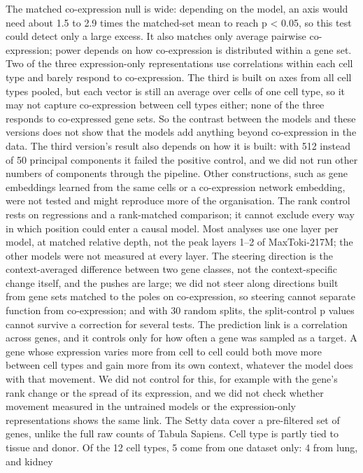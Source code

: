 \documentclass[
  11pt,
]{article}
\newcounter{none} %
\begin{document}
The matched co-expression null is wide: depending on the model, an axis
would need about 1.5 to 2.9 times the matched-set mean to reach p
\textless{} 0.05, so this test could detect only a large excess. It also
matches only average pairwise co-expression; power depends on how
co-expression is distributed within a gene set. Two of the three
expression-only representations use correlations within each cell type
and barely respond to co-expression. The third is built on axes from all
cell types pooled, but each vector is still an average over cells of one
cell type, so it may not capture co-expression between cell types
either; none of the three responds to co-expressed gene sets. So the
contrast between the models and these versions does not show that the
models add anything beyond co-expression in the data. The third
version's result also depends on how it is built: with 512 instead of 50
principal components it failed the positive control, and we did not run
other numbers of components through the pipeline. Other constructions,
such as gene embeddings learned from the same cells or a co-expression
network embedding, were not tested and might reproduce more of the
organisation. The rank control rests on regressions and a rank-matched
comparison; it cannot exclude every way in which position could enter a
causal model. Most analyses use one layer per model, at matched relative
depth, not the peak layers 1--2 of MaxToki-217M; the other models were
not measured at every layer. The steering direction is the
context-averaged difference between two gene classes, not the
context-specific change itself, and the pushes are large; we did not
steer along directions built from gene sets matched to the poles on
co-expression, so steering cannot separate function from co-expression;
and with 30 random splits, the split-control p values cannot survive a
correction for several tests. The prediction link is a correlation
across genes, and it controls only for how often a gene was sampled as a
target. A gene whose expression varies more from cell to cell could both
move more between cell types and gain more from its own context,
whatever the model does with that movement. We did not control for this,
for example with the gene's rank change or the spread of its expression,
and we did not check whether movement measured in the untrained models
or the expression-only representations shows the same link. The Setty
data cover a pre-filtered set of genes, unlike the full raw counts of
Tabula Sapiens. Cell type is partly tied to tissue and donor. Of the 12
cell types, 5 come from one dataset only: 4 from lung, and kidney
\end{document}
